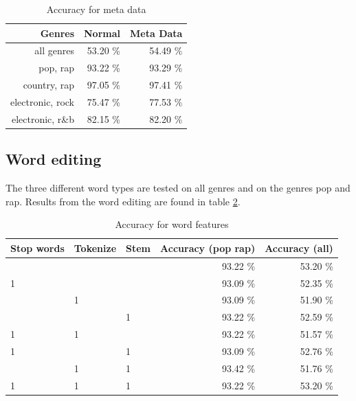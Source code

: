 \documentclass[a4paper, 12pt]{article}
\begin{document}
\begin{table}[h]
\begin{center}
    \begin{tabular}{| r | r | r |}
        \hline
        Genres & Normal & Meta Data \\
        \hline
        all genres & 53.20 \% & 54.49 \% \\

        pop, rap & 93.22 \% & 93.29 \% \\

        country, rap & 97.05 \% & 97.41 \% \\

        electronic, rock & 75.47 \% & 77.53 \% \\

        electronic, r\&b & 82.15 \% & 82.20 \% \\
        \hline
    \end{tabular}
    \caption{Accuracy for meta data}
    \label{tab:res-meta}
\end{center}
\end{table}

\subsection{Word editing}
The three different word types are tested on all genres and on the genres pop and rap.
Results from the word editing are found in table \ref{tab:res-words}.

\begin{table}[h]
\begin{center}
    \begin{tabular}{| l | l | l | r | r | }
        \hline
        Stop words & Tokenize & Stem & Accuracy (pop rap) & Accuracy (all) \\
        \hline
          &   &   & 93.22 \% & 53.20 \% \\ \hline
        1 &   &   & 93.09 \% & 52.35 \% \\ \hline
          & 1 &   & 93.09 \% & 51.90 \% \\ \hline
          &   & 1 & 93.22 \% & 52.59 \% \\ \hline
        1 & 1 &   & 93.22 \% & 51.57 \% \\ \hline
        1 &   & 1 & 93.09 \% & 52.76 \% \\ \hline
          & 1 & 1 & 93.42 \% & 51.76 \% \\ \hline
        1 & 1 & 1 & 93.22 \% & 53.20 \% \\ \hline
    \end{tabular}
    \caption{Accuracy for word features}
    \label{tab:res-words}
\end{center}
\end{table}
\end{document}
